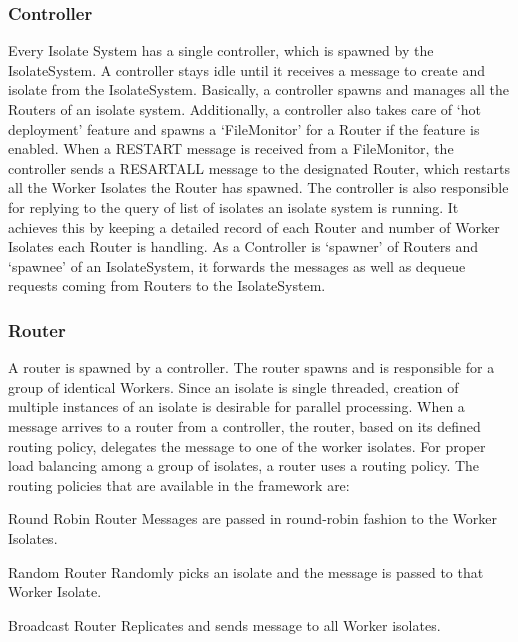   \subsubsection{Controller}
  Every Isolate System has a single controller, which is spawned by the IsolateSystem. A controller stays idle until it receives a message to create and isolate from the IsolateSystem. Basically, a controller spawns and manages all the Routers of an isolate system. Additionally, a controller also takes care of ‘hot deployment’ feature and spawns a ‘FileMonitor’ for a Router if the feature is enabled. When a RESTART message is received from a FileMonitor, the controller sends a RESART\textunderscore{}ALL message to the designated Router, which restarts all the Worker Isolates the Router has spawned.
  The controller is also responsible for replying to the query of list of isolates an isolate system is running. It achieves this by keeping a detailed record of each Router and number of Worker Isolates each Router is handling.
  As a  Controller is ‘spawner’ of Routers and ‘spawnee’ of an IsolateSystem, it forwards the messages as well as dequeue requests coming from Routers to the IsolateSystem.

  \subsubsection{Router}
  A router is spawned by a controller. The router spawns and is responsible for a group of identical Workers. Since an isolate is single threaded, creation of multiple instances of an isolate is desirable for parallel processing. When a message arrives to a router from a controller, the router, based on its defined routing policy, delegates the message to one of the worker isolates.
  For proper load balancing among a group of isolates, a router uses a routing policy. The routing policies that are available in the framework are:

  \begin{description}
    \item{Round Robin Router} Messages are passed in round-robin fashion to the Worker Isolates.

    \item{Random Router} Randomly picks an isolate and the message is passed to that Worker Isolate.

    \item{Broadcast Router} Replicates and sends message to all Worker isolates.
  \end{description}

